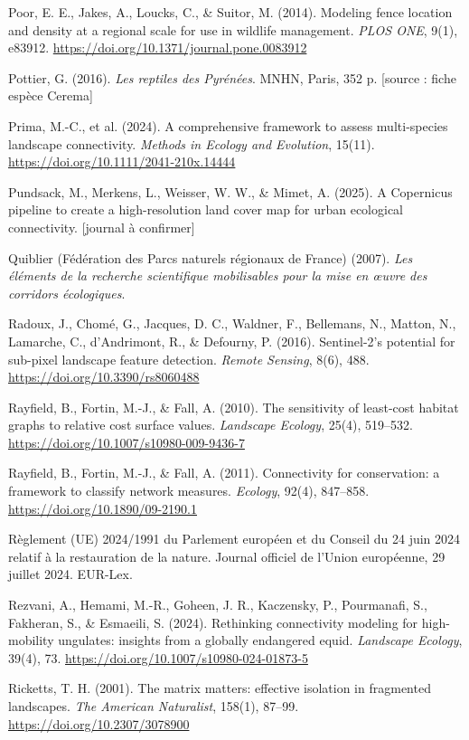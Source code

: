 \documentclass[a4paper,11pt]{report}
\begin{document}
Poor, E. E., Jakes, A., Loucks, C., \& Suitor, M. (2014). Modeling fence location and density at a regional scale for use in wildlife management. \textit{PLOS ONE}, 9(1), e83912. \url{https://doi.org/10.1371/journal.pone.0083912}

Pottier, G. (2016). \textit{Les reptiles des Pyrénées}. MNHN, Paris, 352 p. [source : fiche espèce Cerema]

Prima, M.-C., et al. (2024). A comprehensive framework to assess multi-species landscape connectivity. \textit{Methods in Ecology and Evolution}, 15(11). \url{https://doi.org/10.1111/2041-210x.14444}

Pundsack, M., Merkens, L., Weisser, W. W., \& Mimet, A. (2025). A Copernicus pipeline to create a high-resolution land cover map for urban ecological connectivity. [journal à confirmer]

Quiblier (Fédération des Parcs naturels régionaux de France) (2007). \textit{Les éléments de la recherche scientifique mobilisables pour la mise en \oe{}uvre des corridors écologiques}.

Radoux, J., Chomé, G., Jacques, D. C., Waldner, F., Bellemans, N., Matton, N., Lamarche, C., d'Andrimont, R., \& Defourny, P. (2016). Sentinel-2's potential for sub-pixel landscape feature detection. \textit{Remote Sensing}, 8(6), 488. \url{https://doi.org/10.3390/rs8060488}

Rayfield, B., Fortin, M.-J., \& Fall, A. (2010). The sensitivity of least-cost habitat graphs to relative cost surface values. \textit{Landscape Ecology}, 25(4), 519--532. \url{https://doi.org/10.1007/s10980-009-9436-7}

Rayfield, B., Fortin, M.-J., \& Fall, A. (2011). Connectivity for conservation: a framework to classify network measures. \textit{Ecology}, 92(4), 847--858. \url{https://doi.org/10.1890/09-2190.1}

Règlement (UE) 2024/1991 du Parlement européen et du Conseil du 24 juin 2024 relatif à la restauration de la nature. Journal officiel de l'Union européenne, 29 juillet 2024. EUR-Lex.

Rezvani, A., Hemami, M.-R., Goheen, J. R., Kaczensky, P., Pourmanafi, S., Fakheran, S., \& Esmaeili, S. (2024). Rethinking connectivity modeling for high-mobility ungulates: insights from a globally endangered equid. \textit{Landscape Ecology}, 39(4), 73. \url{https://doi.org/10.1007/s10980-024-01873-5}

Ricketts, T. H. (2001). The matrix matters: effective isolation in fragmented landscapes. \textit{The American Naturalist}, 158(1), 87--99. \url{https://doi.org/10.2307/3078900}
\end{document}
